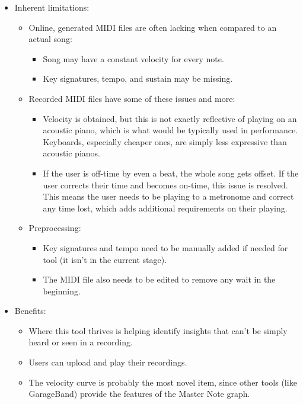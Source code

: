 \documentclass[journal]{vgtc}                %
\begin{document}
\begin{itemize}
  \item Inherent limitations:
  \begin{itemize}
    \item Online, generated MIDI files are often lacking when compared to an
    actual song:
    \begin{itemize}
      \item Song may have a constant velocity for every note.
      \item Key signatures, tempo, and sustain may be missing.
    \end{itemize}
    \item Recorded MIDI files have some of these issues and more:
    \begin{itemize}
      \item Velocity is obtained, but this is not exactly reflective of playing
      on an acoustic piano, which is what would be typically used in performance.
      Keyboards, especially cheaper ones, are simply less expressive than acoustic
      pianos.
      \item If the user is off-time by even a beat, the whole song gets offset.
      If the user corrects their time and becomes on-time, this issue is resolved.
      This means the user needs to be playing to a metronome and correct any time
      lost, which adds additional requirements on their playing.
    \end{itemize}
    \item Preprocessing:
    \begin{itemize}
      \item Key signatures and tempo need to be manually added if needed for tool
      (it isn’t in the current stage).
      \item The MIDI file also needs to be edited to remove any wait in the
      beginning.
    \end{itemize}
  \end{itemize}
  \item Benefits:
  \begin{itemize}
    \item Where this tool thrives is helping identify insights that can’t be
    simply heard or seen in a recording.
    \item Users can upload and play their recordings.
    \item The velocity curve is probably the most novel item, since other tools
    (like GarageBand) provide the features of the Master Note graph.

\end{itemize}
\end{itemize}
\end{document}
